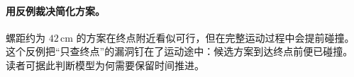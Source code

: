 \paragraph{用反例裁决简化方案。}
螺距约为 $42\,\mathrm{cm}$ 的方案在终点附近看似可行，但在完整运动过程中会提前碰撞。
这个反例把“只查终点”的漏洞钉在了运动途中：候选方案到达终点前便已碰撞。
读者可据此判断模型为何需要保留时间推进。

